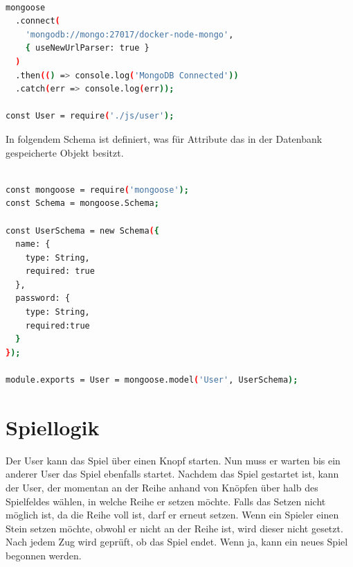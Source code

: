\begin{lstlisting}[language=bash, caption={Verbindungsaufbau mit der MongoDB}, label=lis:POST]

mongoose
  .connect(
    'mongodb://mongo:27017/docker-node-mongo',
    { useNewUrlParser: true }
  )
  .then(() => console.log('MongoDB Connected'))
  .catch(err => console.log(err));

const User = require('./js/user');

\end{lstlisting}

In folgendem Schema ist definiert, was für Attribute das in der Datenbank gespeicherte Objekt besitzt. 

\begin{lstlisting}[language=bash, caption={Datenschema in der MongoDB}, label=lis:POST]

const mongoose = require('mongoose');
const Schema = mongoose.Schema;

const UserSchema = new Schema({
  name: {
    type: String,
    required: true
  },
  password: {
    type: String,
    required:true
  }
});

module.exports = User = mongoose.model('User', UserSchema);

\end{lstlisting}

\section{Spiellogik}\label{sec:Spiellogik}
Der User kann das Spiel über einen Knopf starten. Nun muss er warten bis ein anderer User das Spiel ebenfalls startet. Nachdem das Spiel gestartet ist, kann der User, der momentan an der Reihe anhand von Knöpfen über halb des Spielfeldes wählen, in welche Reihe er setzen möchte. Falls das Setzen nicht möglich ist, da die Reihe voll ist, darf er erneut setzen. Wenn ein Spieler einen Stein setzen möchte, obwohl er nicht an der Reihe ist, wird dieser nicht gesetzt. Nach jedem Zug wird geprüft, ob das Spiel endet. Wenn ja, kann ein neues Spiel begonnen werden.

